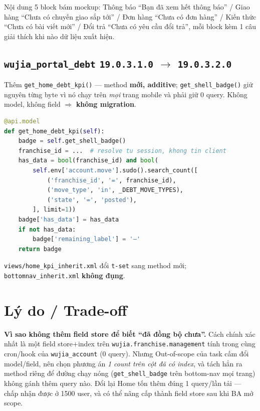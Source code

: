 Nội dung 5 block bám mockup: Thông báo ``Bạn đã xem hết thông báo'' / Giao hàng ``Chưa có chuyến
giao sắp tới'' / Đơn hàng ``Chưa có đơn hàng'' / Kiến thức ``Chưa có bài viết mới'' / Đổi trả
``Chưa có yêu cầu đổi trả'', mỗi block kèm 1 câu giải thích khi nào dữ liệu xuất hiện.

\subsection{\texttt{wujia\_portal\_debt} \texttt{19.0.3.1.0} $\rightarrow$ \texttt{19.0.3.2.0}}

Thêm \texttt{get\_home\_debt\_kpi()} --- method \textbf{mới, additive};
\texttt{get\_shell\_badge()} giữ nguyên từng byte vì nó chạy trên \emph{mọi} trang mobile và phải
giữ 0 query. Không model, không field $\Rightarrow$ \textbf{không migration}.

\begin{lstlisting}[language=Python]
@api.model
def get_home_debt_kpi(self):
    badge = self.get_shell_badge()
    franchise_id = ...  # resolve tu session, khong tin client
    has_data = bool(franchise_id) and bool(
        self.env['account.move'].sudo().search_count([
            ('franchise_id', '=', franchise_id),
            ('move_type', 'in', _DEBT_MOVE_TYPES),
            ('state', '=', 'posted'),
        ], limit=1))
    badge['has_data'] = has_data
    if not has_data:
        badge['remaining_label'] = '—'
    return badge
\end{lstlisting}

\texttt{views/home\_kpi\_inherit.xml} đổi \texttt{t-set} sang method mới;
\texttt{bottomnav\_inherit.xml} \textbf{không đụng}.

\section{Lý do / Trade-off}

\textbf{Vì sao không thêm field store để biết ``đã đồng bộ chưa''.} Cách chính xác nhất là một
field store$+$index trên \texttt{wujia.franchise.management} tính trong cùng cron/hook của
\texttt{wujia\_account} ($0$ query). Nhưng Out-of-scope của task cấm đổi model/field, nên chọn
phương án \emph{1 count trên cột đã có index}, và tách hẳn ra method riêng để đường chạy nóng
(\texttt{get\_shell\_badge} trên bottom-nav mọi trang) không gánh thêm query nào. Đổi lại Home
tốn thêm đúng 1 query/lần tải --- chấp nhận được ở 1500 user, và có thể nâng cấp thành field
store sau khi BA mở scope.

